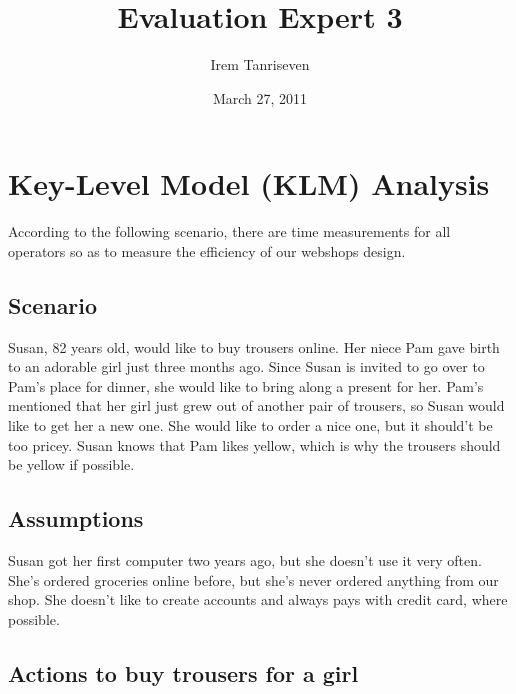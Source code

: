 \documentclass[a4paper,12pt]{scrartcl}
\begin{document}
\title{Evaluation Expert 3}
\date{March 27, 2011}
\author{Irem Tanriseven}
\maketitle

\section{Key-Level Model (KLM) Analysis}
According to the following scenario, there are time measurements for all operators so as to measure the efficiency of our webshops design.

\subsection{Scenario}
Susan, 82 years old, would like to buy trousers online. Her niece Pam gave birth to an adorable girl just three months ago. Since Susan is invited to go over to Pam's place for dinner, she would like to bring along a present for her. Pam's mentioned that her girl just grew out of another pair of trousers, so Susan would like to get her a new one. She would like to order a nice one, but it should't be too pricey. Susan knows that Pam likes yellow, which is why the trousers should be yellow if possible.

\subsection{Assumptions}
Susan got her first computer two years ago, but she doesn't use it very often. She's ordered groceries online before, but she's never ordered anything from our shop. She doesn't like to create accounts and always pays with credit card, where possible.

\subsection{Actions to buy trousers for a girl}
\end{document}
